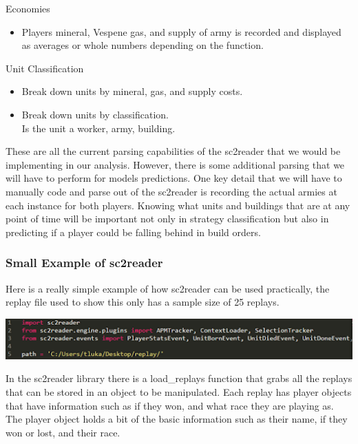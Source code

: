 \documentclass[a4paper,12pt]{report}
\begin{document}
\vspace*{-.4cm}
Economies
\vspace*{-.9cm}
\begin{itemize}[,]
    \setlength\itemsep{-.1cm}
    \item Players mineral, Vespene gas, and supply of army is recorded and displayed as averages or whole numbers depending on the function.
\end{itemize}
\vspace*{-.4cm}
Unit Classification
\vspace*{-.9cm}
\begin{itemize}[,]
    \setlength\itemsep{-.1cm}
    \item Break down units by mineral, gas, and supply costs.
    \item Break down units by classification. \\
    Is the unit a worker, army, building.
\end{itemize}

These are all the current parsing capabilities of the sc2reader that we would be implementing in our analysis. However, there is some additional parsing that we will have to perform for models predictions. One key detail that we will have to manually code and parse out of the sc2reader is recording the actual armies at each instance for both players. Knowing what units and buildings that are at any point of time will be important not only in strategy classification but also in predicting if a player could be falling behind in build orders.


\subsubsection{Small Example of sc2reader}

Here is a really simple example of how sc2reader can be used practically, the replay file used to show this only has a sample size of 25 replays.

\begin{center}
    \captionsetup{type=figure}
    \includegraphics[width=.9\linewidth]{media/SC2replays25.png}
\end{center}

In the sc2reader library there is a load\_replays function that grabs all the replays that can be stored in an object to be manipulated. Each replay has player objects that have information such as if they won, and what race they are playing as. The player object holds a bit of the basic information such as their name, if they won or lost, and their race. 
\end{document}

